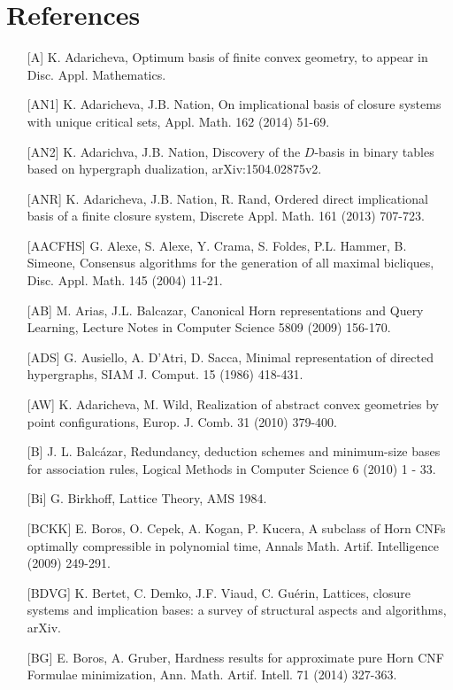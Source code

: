 \documentclass[11pt]{article}
\begin{document}
\section*{References}
\begin{enumerate}
\item[{[A]}] K. Adaricheva, Optimum basis of finite convex geometry, to appear in Disc. Appl. Mathematics.
	\item[{[AN1]}] K. Adaricheva, J.B. Nation, On implicational basis of closure systems with unique critical sets, Appl. Math. 162 (2014) 51-69.
\item[{[AN2]}] K. Adarichva,  J.B. Nation, Discovery of the $D$-basis in binary tables based on hypergraph dualization, arXiv:1504.02875v2.
	\item[{[ANR]}] K. Adaricheva, J.B. Nation, R. Rand, Ordered direct implicational basis of a finite closure system, Discrete Appl. Math. 161 (2013) 707-723.
\item[{[AACFHS]}] G. Alexe, S. Alexe, Y. Crama, S. Foldes, P.L. Hammer, B. Simeone, Consensus algorithms for the generation of all maximal bicliques, Disc. Appl. Math. 145 (2004) 11-21.
	\item [{[AB]}] M. Arias, J.L. Balcazar, Canonical Horn representations and Query Learning, Lecture Notes in Computer Science 5809 (2009) 156-170.
	\item[{[ADS]}] G. Ausiello, A. D'Atri, D. Sacca, Minimal representation of directed hypergraphs, SIAM J. Comput. 15 (1986) 418-431.
\item[{[AW]}] K. Adaricheva, M. Wild, Realization of abstract convex geometries by point configurations, Europ. J. Comb. 31 (2010) 379-400.
\item[{[B]}] J. L. Balc\'{a}zar, Redundancy, deduction schemes and minimum-size bases for association rules, Logical Methods in Computer Science 6 (2010) 1 - 33.
\item[{[Bi]}] G. Birkhoff, Lattice Theory, AMS 1984.
\item[{[BCKK]}] E. Boros, O. Cepek, A. Kogan, P. Kucera, A subclass of Horn CNFs optimally compressible in polynomial time, Annals Math. Artif. Intelligence (2009) 249-291.
\item[{[BDVG]}] K. Bertet, C. Demko, J.F. Viaud, C. Gu\'{e}rin, Lattices, closure systems and implication bases: a survey of structural aspects and algorithms, arXiv.
	\item[{[BG]}] E. Boros, A. Gruber, Hardness results for approximate pure Horn CNF Formulae minimization, Ann. Math. Artif. Intell. 71 (2014) 327-363.

\end{enumerate}
\end{document}
